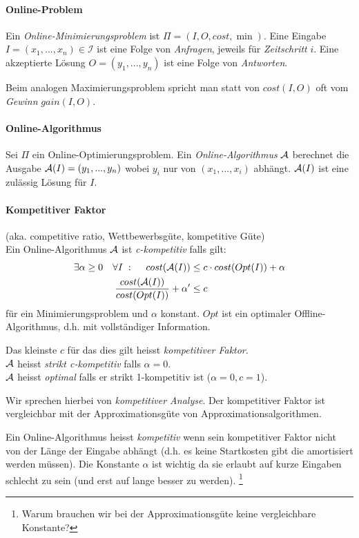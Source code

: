 \paragraph{Online-Problem}
Ein \emph{Online-Minimierungsproblem} ist $\Pi = (I, O, cost, \min)$.
Eine Eingabe $I = (x_1, ..., x_n) \in \mathcal{I}$ ist eine Folge von \emph{Anfragen},
jeweils für \emph{Zeitschritt} $i$.
Eine akzeptierte Lösung $O = (y_1, ..., y_n)$ ist eine Folge von \emph{Antworten}.

Beim analogen Maximierungsproblem spricht man statt von $cost(I, O)$ oft vom \emph{Gewinn} $gain(I,O)$.

\paragraph{Online-Algorithmus}
Sei $\Pi$ ein Online-Optimierungsproblem.
Ein \emph{Online-Algorithmus} $\mathcal{A}$ berechnet die Ausgabe $\mathcal{A}(I) = (y_1, ..., y_n) $
wobei $y_i$ nur von $(x_1, ..., x_i)$ abhängt.
$\mathcal{A}(I)$ ist eine zulässig Lösung für $I$.

\paragraph{Kompetitiver Faktor}
(aka. competitive ratio, Wettbewerbsgüte, kompetitive Güte) \\
Ein Online-Algorithmus $\mathcal{A}$ ist \emph{c-kompetitiv} falls gilt:
\begin{align*}
\exists \alpha \geq 0 \quad \forall I \; : \; \quad cost(\mathcal{A}(I)) & \leq c \cdot cost(Opt(I)) + \alpha \\
\dfrac{cost(\mathcal{A}(I))}{cost(Opt(I))} + \alpha' & \leq c
\end{align*}
für ein Minimierungsproblem und $\alpha$ konstant.
$Opt$ ist ein optimaler Offline-Algorithmus, d.h. mit vollständiger Information.

Das kleinste $c$ für das dies gilt heisst \emph{kompetitiver Faktor}. \\
$\mathcal{A}$ heisst \emph{strikt c-kompetitiv} falls $\alpha = 0$. \\
$\mathcal{A}$ heisst \emph{optimal} falls er strikt 1-kompetitiv ist ($\alpha = 0, c = 1$).

Wir sprechen hierbei von \emph{kompetitiver Analyse}.
Der kompetitiver Faktor ist vergleichbar mit der Approximationsgüte von Approximationsalgorithmen.

Ein Online-Algorithmus heisst \emph{kompetitiv} wenn sein kompetitiver Faktor nicht von der
Länge der Eingabe abhängt (d.h. es keine Startkosten gibt die amortisiert werden müssen).
Die Konstante $\alpha$ ist wichtig da sie erlaubt auf kurze Eingaben schlecht zu sein
(und erst auf lange besser zu werden).
\footnote{Warum brauchen wir bei der Approximationsgüte keine vergleichbare Konstante?}

